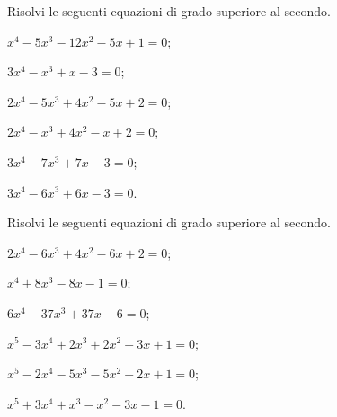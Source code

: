 \begin{esercizio}[\Ast] %
Risolvi le seguenti equazioni di grado superiore al secondo.
\begin{multicols}{2}
\begin{enumeratea}
\item $x^4-5x^3-12x^2-5x+1=0$;
\item $3x^4-x^3+x-3=0$;
\item $2x^4-5x^3+4x^2-5x+2=0$;
\item $2x^4-x^3+4x^2-x+2=0$;
\item $3x^4-7x^3+7x-3=0$;
\item $3x^4-6x^3+6x-3=0$.
\end{enumeratea}
\end{multicols}
\end{esercizio}

\begin{esercizio}[\Ast] %
Risolvi le seguenti equazioni di grado superiore al secondo.
\begin{multicols}{2}
\begin{enumeratea}
\item $2x^4-6x^3+4x^2-6x+2=0$;
\item $x^4+8x^3-8x-1=0$;
\item $6x^4-37x^3+37x-6=0$;
\item $x^5-3x^4+2x^3+2x^2-3x+1=0$;
\item $x^5-2x^4-5x^3-5x^2-2x+1=0$;
\item $x^5+3x^4+x^3-x^2-3x-1=0$.
\end{enumeratea}
\end{multicols}
\end{esercizio}

